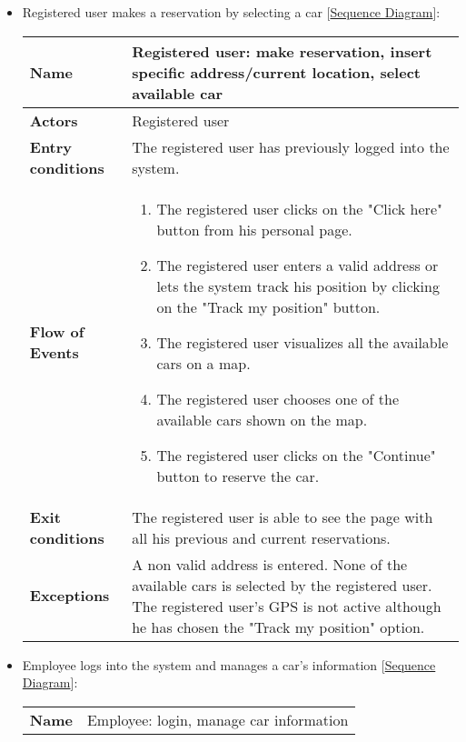 \begin{itemize}
\begin{table}[H]
\begin{tabular}{| m{3.5cm} | m{9.5cm} |}
		\hline
	\end{tabular}
\end{table}
\newpage
\item Registered user makes a reservation by selecting a car [\hyperlink{Reservation}{Sequence Diagram}]:
\begin{table}[H]
	\centering
	\begin{tabular}{| m{3.5cm} | m{9.5cm} |}
		\hline
		\textbf{Name} & Registered user: make reservation, insert specific address/current location, select available car\\
		\hline
		\textbf{Actors} & Registered user\\
		\hline
		\textbf{Entry conditions} & The registered user has previously logged into the system.\\
		\hline
		\textbf{Flow of Events} & 
		\begin{enumerate}
			\item The registered user clicks on the "Click here" button from his personal page.
			\item The registered user enters a valid address or lets the system track his position by clicking on the "Track my position" button.
			\item The registered user visualizes all the available cars on a map.
			\item The registered user chooses one of the available cars shown on the map.
			\item The registered user clicks on the "Continue" button to reserve the car.   
		\end{enumerate} \\
		\hline
		\textbf{Exit conditions} & The registered user is able to see the page with all his previous and current reservations.\\
		\hline
		\textbf{Exceptions} & A non valid address is entered. None of the available cars is selected by the registered user. The registered user's GPS is not active although he has chosen the "Track my position" option.\\
		\hline
	\end{tabular}
\end{table}
\newpage
\item Employee logs into the system and manages a car's information [\hyperlink{EmployeeManageCarInfo}{Sequence Diagram}]:
\begin{table}[H]
	\centering
	\begin{tabular}{| m{3.5cm} | m{9.5cm} |}
		\hline
		\textbf{Name} & Employee: login, manage car information\\

\end{tabular}
\end{table}
\end{itemize}
